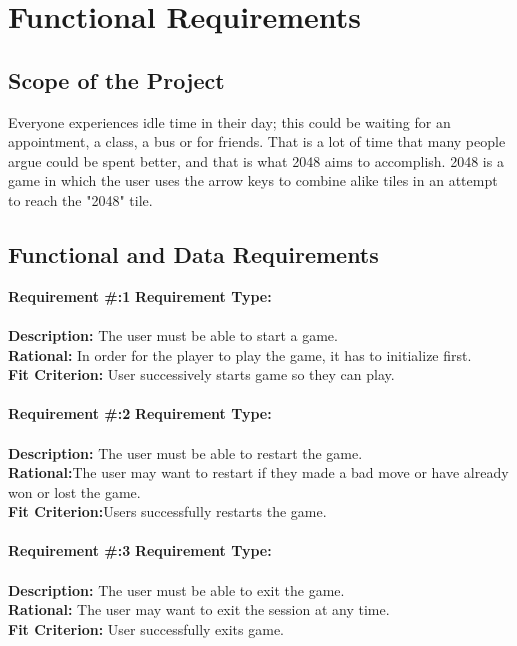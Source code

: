 \documentclass[12pt]{article}
\begin{document}
\section{Functional Requirements}
\subsection{Scope of the Project}
Everyone experiences idle time in their day; this could be waiting for an appointment, a class, a bus or for friends. 
That is a lot of time that many people argue could be spent better, and that is what 2048 aims to accomplish. 
2048 is a game in which the user uses the arrow keys to combine alike tiles in an attempt to reach the "2048" tile.

\subsection{Functional and Data Requirements}
\textbf {Requirement \#:1} \indent\textbf {Requirement Type:}\\\\
\textbf {Description:} The user must be able to start a game.\\
\textbf {Rational:} In order for the player to play the game, it has to initialize first.\\
\textbf {Fit Criterion:} User successively starts game so they can play. \\\\

\textbf {Requirement \#:2} \indent\textbf {Requirement Type:} \\\\
\textbf {Description:} The user must be able to restart the game.\\
\textbf {Rational:}The user may want to restart if they made a bad move or have already won or lost the game. \\
\textbf {Fit Criterion:}Users successfully restarts the game. \\\\

\textbf {Requirement \#:3} \indent\textbf {Requirement Type:}\\\\
\textbf {Description:} The user must be able to exit the game.\\
\textbf {Rational:} The user may want to exit the session at any time.\\
\textbf {Fit Criterion:} User successfully exits game. \\\\
\end{document}
